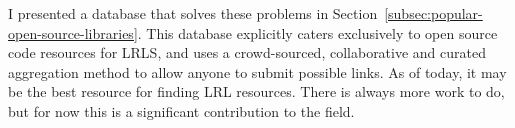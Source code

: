 I presented a database that solves these problems in Section~\ref{subsec:popular-open-source-libraries}. This database explicitly caters exclusively to open source code resources for LRLS, and uses a crowd-sourced, collaborative and curated aggregation method to allow anyone to submit possible links. As of today, it may be the best resource for finding LRL resources. There is always more work to do, but for now this is a significant contribution to the field.



